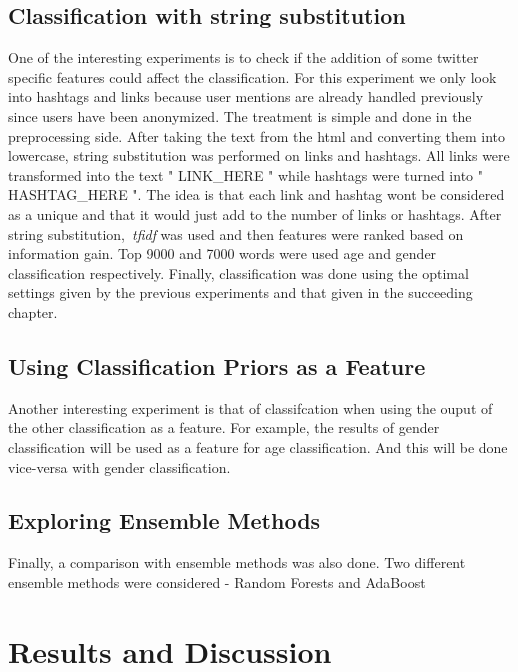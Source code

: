 \documentclass[a4paper]{llncs}
\begin{document}
\subsection{Classification with string substitution}
One of the interesting experiments is to check if the addition of some twitter specific features could affect the classification. For this experiment we only look into hashtags and links because user mentions are already handled previously since users have been anonymized. The treatment is simple and done in the preprocessing side. After taking the text from the html and converting them into lowercase, string substitution was performed on links and hashtags. All links were transformed into the text " LINK\_HERE " while hashtags were turned into " HASHTAG\_HERE ". The idea is that each link and hashtag wont be considered as a unique and that it would just add to the number of links or hashtags. After string substitution,~\textit{tfidf} was used and then features were ranked based on information gain. Top 9000 and 7000 words were used age and gender classification respectively. Finally, classification was done using the optimal settings given by the previous experiments and that given in the succeeding chapter. 


\subsection{Using Classification Priors as a Feature}
Another interesting experiment is that of classifcation when using the ouput of the other classification as a feature. For example, the results of gender classification will be used as a feature for age classification. And this will be done vice-versa with gender classification.  


\subsection{Exploring Ensemble Methods}
Finally, a comparison with ensemble methods was also done. Two different ensemble methods were considered - Random Forests and AdaBoost







\section{Results and Discussion}	
\end{document}
